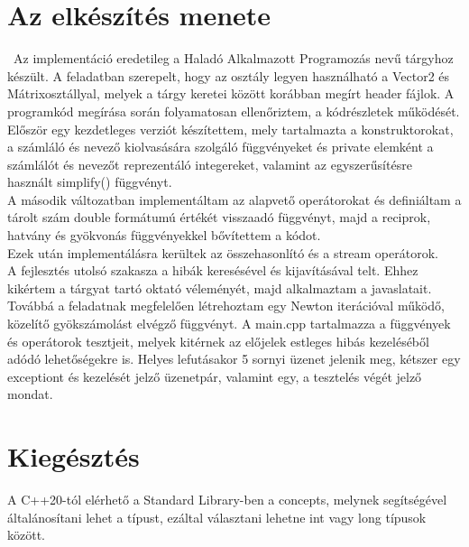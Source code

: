 \documentclass[a4paper, 12pt]{article}
\begin{document}
\section{Az elkészítés menete}
\ Az implementáció eredetileg a Haladó Alkalmazott Programozás nevű tárgyhoz készült.
A feladatban szerepelt, hogy az osztály legyen használható a Vector2 és Mátrixosztállyal, melyek a tárgy keretei között korábban megírt header fájlok.
\newline
\newline
\indent A programkód megírása során folyamatosan ellenőriztem, a kódrészletek működését.
Először egy kezdetleges verziót készítettem, mely tartalmazta a konstruktorokat, a számláló és nevező kiolvasására szolgáló függvényeket és private elemként a számlálót és nevezőt reprezentáló integereket, valamint az egyszerűsítésre használt simplify() függvényt. 
\\
\indent A második változatban implementáltam az alapvető operátorokat és definiáltam a tárolt szám double formátumú értékét visszaadó függvényt, majd a reciprok, hatvány és gyökvonás függvényekkel bővítettem a kódot.
\\
\indent Ezek után implementálásra kerültek az összehasonlító és a stream operátorok.
\\
\indent A fejlesztés utolsó szakasza a hibák keresésével és kijavításával telt. Ehhez kikértem a tárgyat tartó oktató véleményét, majd alkalmaztam a javaslatait. Továbbá a feladatnak megfelelően létrehoztam egy Newton iterációval működő, közelítő gyökszámolást elvégző függvényt. A main.cpp tartalmazza a függvények és operátorok tesztjeit, melyek kitérnek az előjelek estleges hibás kezeléséből adódó lehetőségekre is.
Helyes lefutásakor 5 sornyi üzenet jelenik meg, kétszer egy exceptiont és kezelését jelző üzenetpár, valamint egy, a tesztelés végét 
jelző mondat.

\section{Kiegésztés}
A C++20-tól elérhető a Standard Library-ben a concepts, melynek segítségével általánosítani lehet a típust, ezáltal választani lehetne int vagy long típusok között.
\end{document}
